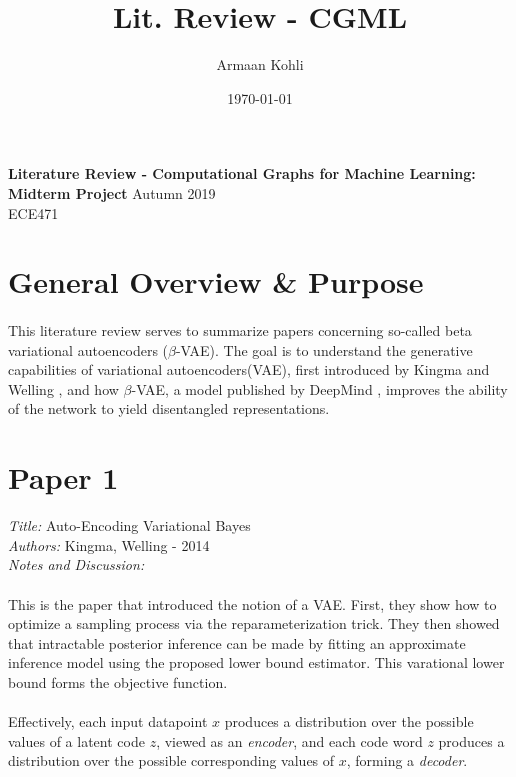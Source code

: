 \documentclass[justified,nobib]{tufte-handout}
\title{Lit. Review - CGML}
\author{Armaan Kohli}
\date{\today}
\begin{document}
\begin{fullwidth}
{
  \noindent\fontsize{12pt}{20pt}\selectfont\textbf{Literature Review - Computational Graphs for Machine Learning: Midterm Project}
  \newline
  \fontsize{12pt}{18pt}\selectfont
  {Autumn 2019} \\
  {ECE471}
}
\raggedright
\raggedbottom
\section{General Overview \& Purpose}
\paragraph{} This literature review serves to summarize papers concerning so-called beta variational autoencoders ($\beta$-VAE). The goal is to understand the generative capabilities of variational autoencoders(VAE), first introduced by Kingma and Welling \cite{ae} , and how $\beta$-VAE, a model published by DeepMind \cite{bvae} \cite{bvae-dis},  improves the ability of the network to yield disentangled representations.  
\\
\noindent\hrulefill 
\section{Paper 1}
\textit{Title:} Auto-Encoding Variational Bayes  \cite{ae} \\
\textit{Authors: }Kingma, Welling - 2014 \\
\textit{Notes and Discussion:} \\
\paragraph{} This is the paper that introduced the notion of a VAE. First, they show how to optimize a sampling process via the reparameterization trick. They then showed that intractable posterior inference can be made by fitting an approximate inference model using the proposed lower bound estimator. This varational lower bound forms the objective function. 
\paragraph{} Effectively, each input datapoint $x$ produces a distribution over the possible values of a latent code $z$, viewed as an \textit{encoder}, and each code word $z$ produces a distribution over the possible corresponding values of $x$, forming a \textit{decoder}.   \\
\noindent\hrulefill

\end{fullwidth}
\end{document}
